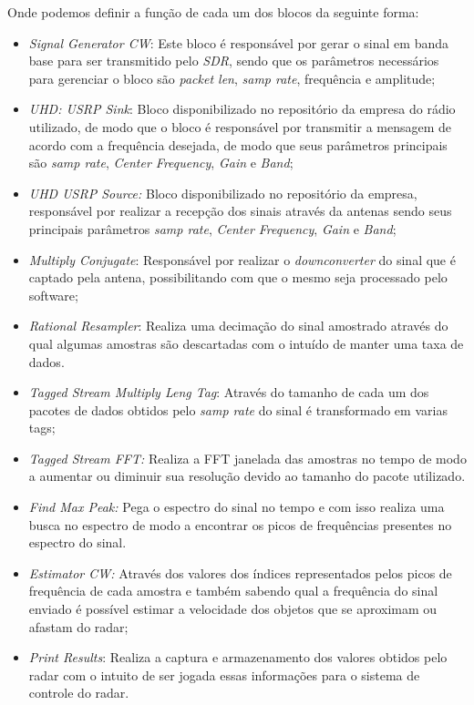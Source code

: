 Onde podemos definir a função de cada um dos blocos da seguinte forma:
\begin{itemize}
    \item \emph{Signal Generator CW}: Este bloco é responsável por gerar o sinal em banda base para ser transmitido pelo \emph{SDR}, sendo que os parâmetros necessários para gerenciar o bloco são \emph{packet len}, \emph{samp rate}, frequência e amplitude;
    \item \emph{UHD: USRP Sink}: Bloco disponibilizado no repositório da empresa do rádio utilizado, de modo que o bloco é responsável por transmitir a mensagem de acordo com a frequência desejada, de modo que seus parâmetros principais são \emph{samp rate}, \emph{Center Frequency}, \emph{Gain} e \emph{Band};
    \item \emph{UHD USRP Source:}  Bloco disponibilizado no repositório da empresa, responsável por realizar a recepção dos sinais através da antenas sendo seus principais parâmetros \emph{samp rate}, \emph{Center Frequency}, \emph{Gain} e \emph{Band};
    \item \emph{Multiply Conjugate}: Responsável por realizar o \emph{downconverter} do sinal que é captado pela antena, possibilitando com que o mesmo seja processado pelo software;
    \item \emph{Rational Resampler}: Realiza uma decimação do sinal amostrado através do qual algumas amostras são descartadas com o intuído de manter uma taxa de dados. 
    \item \emph{Tagged Stream Multiply Leng Tag}: Através do tamanho de cada um dos pacotes de dados obtidos pelo \emph{samp rate} do sinal é transformado em varias tags;
    
    \item\emph{Tagged Stream FFT:} Realiza a FFT janelada das amostras no tempo de modo  a aumentar ou diminuir sua resolução devido ao tamanho do pacote utilizado.
    \item \emph{Find Max Peak:} Pega o espectro do sinal no tempo e com isso realiza uma busca no espectro de modo a encontrar os picos de frequências presentes no espectro do sinal.
    \item \emph{Estimator CW:} Através dos valores dos índices representados pelos picos de frequência de cada amostra e também sabendo qual a frequência do sinal enviado é possível estimar a velocidade dos objetos que se aproximam ou afastam do radar;
    \item \emph{Print Results}: Realiza a captura e armazenamento dos valores obtidos pelo radar com o intuito de ser jogada essas informações para o sistema de controle do radar.
\end{itemize} 

